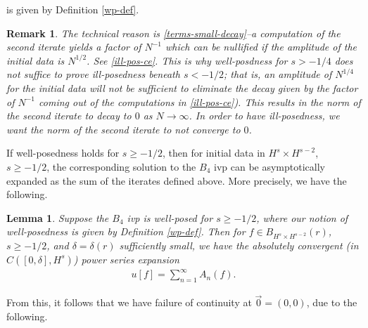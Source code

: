 \documentclass[12pt,reqno]{amsart}
\numberwithin{equation}{section}  %
\newtheorem{lemma}[theorem]{Lemma}
\newtheorem{remark}[theorem]{Remark}
\begin{document}
is given by Definition \ref{wp-def}.
\begin{framed}
\begin{remark}
  The technical reason is
\eqref{terms-small-decay}--a computation of the second iterate yields a factor
of $N^{-1}$
which can be nullified if the amplitude of the initial data is $N^{1/2}$. See
\eqref{ill-pos-ce}. This is why well-posdness for $s > -1/4$ does not suffice to
prove ill-posedness beneath $s < -1/2$; that is, an amplitude of $N^{1/4}$ for
the initial data will not be
sufficient to eliminate the decay given by the factor of $N^{-1}$ coming out of
the computations in \eqref{ill-pos-ce}). This results in the norm of the second
iterate to decay to $0$ as $N \to \infty$. In order to have ill-posedness, we
want the norm of the second iterate to \emph{not} converge to $0$.
\end{remark}
\end{framed}
If well-posedness holds for $s \ge -1/2$, then for
initial data in $H^{s} \times H^{s-2}$, $s \ge -1/2$, the corresponding solution
to the $B_{4}$ ivp can be asymptotically expanded as the sum of the iterates defined
above. More precisely, we have the following.
\begin{lemma}
  \label{lem:qwp-awp}
  Suppose the $B_{4}$ ivp is well-posed for $s \ge -1/2$, where our notion of
  well-posedness is given by Definition \ref{wp-def}. Then for
  $f \in B_{H^{s} \times H^{s-2}}(r)$, $s \ge -1/2$,  and $\delta=\delta(r)$
sufficiently small, we have the absolutely convergent
(in $C([0, \delta], H^{s})$) power series expansion
%
%
\begin{equation}
  \label{power-series-soln}
\begin{split}
  u[f] = \sum_{n=1}^{\infty} A_{n}(f).
\end{split}
\end{equation}
%
%
\label{lem:analytic-wp}
\end{lemma}
%
%
From this, it follows that we have failure of continuity at $\vec{0} =
(0, 0)$, due to the
following.
%
%
%
%
%
%
%
%
%
%
%
\end{document}
